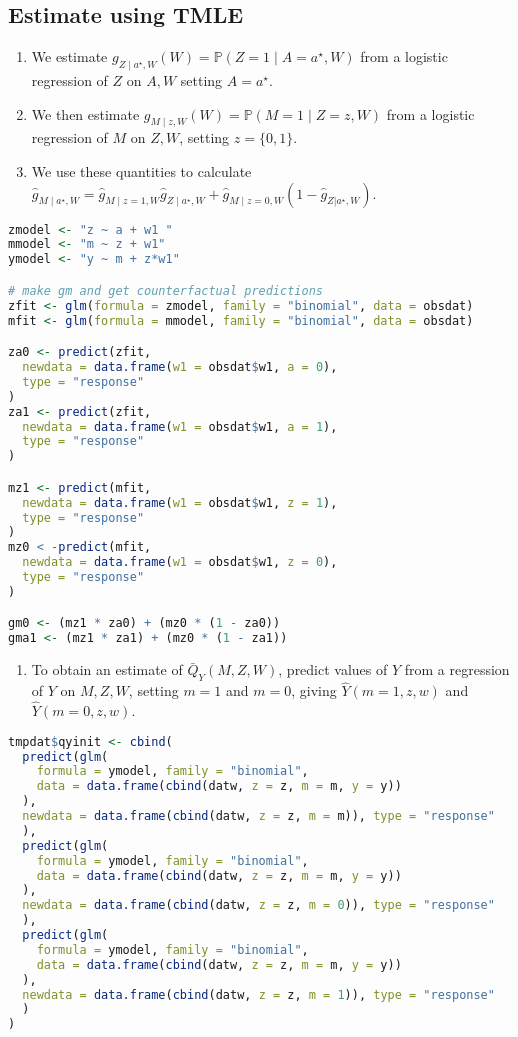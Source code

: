 \documentclass[
  12pt, krantz2,
]{book}
\providecommand{\tightlist}{%
  \setlength{\itemsep}{0pt}\setlength{\parskip}{0pt}}
\theoremstyle{definition}
\theoremstyle{definition}
\theoremstyle{definition}
\renewcommand{\P}{\mathbb{P}}
\newcommand{\1}{\mathbbm{1}}
\begin{document}
\hypertarget{estimate-using-tmle}{%
\subsection{Estimate using TMLE}\label{estimate-using-tmle}}

\begin{enumerate}
\def\labelenumi{\arabic{enumi}.}
\tightlist
\item
  We estimate \(g_{Z \mid a^{\star}, W}(W) = \P(Z=1 \mid A=a^{\star}, W)\) from
  a logistic regression of \(Z\) on \(A, W\) setting \(A=a^{\star}\).
\item
  We then estimate \(g_{M \mid z,W}(W) = \P(M=1 \mid Z=z, W)\) from a logistic
  regression of \(M\) on \(Z, W\), setting \(z=\{0,1\}\).
\item
  We use these quantities to calculate \(\hat{g}_{M \mid a^{\star}, W} = \hat{g}_{M \mid z=1,W}\hat{g}_{Z \mid a^{\star}, W} + \hat{g}_{M \mid z=0,W}(1-\hat{g}_{Z|a^{\star}, W})\).
\end{enumerate}

\begin{lstlisting}[language=R]
zmodel <- "z ~ a + w1 "
mmodel <- "m ~ z + w1"
ymodel <- "y ~ m + z*w1"

# make gm and get counterfactual predictions
zfit <- glm(formula = zmodel, family = "binomial", data = obsdat)
mfit <- glm(formula = mmodel, family = "binomial", data = obsdat)

za0 <- predict(zfit,
  newdata = data.frame(w1 = obsdat$w1, a = 0),
  type = "response"
)
za1 <- predict(zfit,
  newdata = data.frame(w1 = obsdat$w1, a = 1),
  type = "response"
)

mz1 <- predict(mfit,
  newdata = data.frame(w1 = obsdat$w1, z = 1),
  type = "response"
)
mz0 < -predict(mfit,
  newdata = data.frame(w1 = obsdat$w1, z = 0),
  type = "response"
)

gm0 <- (mz1 * za0) + (mz0 * (1 - za0))
gma1 <- (mz1 * za1) + (mz0 * (1 - za1))
\end{lstlisting}

\begin{enumerate}
\def\labelenumi{\arabic{enumi}.}
\setcounter{enumi}{3}
\tightlist
\item
  To obtain an estimate of \(\bar{Q}_{Y}(M,Z,W)\), predict values of \(Y\) from a
  regression of \(Y\) on \(M,Z,W\), setting \(m=1\) and \(m=0\), giving
  \(\hat{Y}(m=1, z, w)\) and \(\hat{Y}(m=0, z, w)\).
\end{enumerate}

\begin{lstlisting}[language=R]
tmpdat$qyinit <- cbind(
  predict(glm(
    formula = ymodel, family = "binomial",
    data = data.frame(cbind(datw, z = z, m = m, y = y))
  ),
  newdata = data.frame(cbind(datw, z = z, m = m)), type = "response"
  ),
  predict(glm(
    formula = ymodel, family = "binomial",
    data = data.frame(cbind(datw, z = z, m = m, y = y))
  ),
  newdata = data.frame(cbind(datw, z = z, m = 0)), type = "response"
  ),
  predict(glm(
    formula = ymodel, family = "binomial",
    data = data.frame(cbind(datw, z = z, m = m, y = y))
  ),
  newdata = data.frame(cbind(datw, z = z, m = 1)), type = "response"
  )
)
\end{lstlisting}
\end{document}
